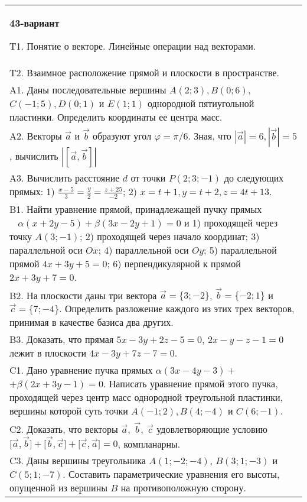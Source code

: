\documentclass{article}
\begin{document}
\begin{tabular}{m{17cm}}
\textbf{43-вариант}
\newline

T1. 
Понятие о векторе. Линейные операции над векторами.
 \\
T2. 
Взаимное расположение прямой и плоскости в пространстве.
 \\
A1. 
Даны последовательные вершины \(A(2;3),B(0;6)\), \(C( - 1;5),D(0;1)\) и \(E(1;1)\) однородной пятиугольной пластинки. Определить координаты ее центра масс.
 \\
A2. 
Векторы \(\overrightarrow{a}\) и \(\overrightarrow{b}\) образуют угол \(\varphi = \pi/6\). Зная, что \(|\overrightarrow{a}| = 6,|\overrightarrow{b}| = 5\), вычислить \(\left| \left\lbrack \overrightarrow{a},\overrightarrow{b} \right\rbrack \right|\)
 \\
A3. 
Вычислить расстояние \(d\) от точки \(P(2;3; - 1)\) до следующих прямых: 1) \(\frac{x - 5}{3} = \frac{y}{2} = \frac{z + 25}{- 2}\); 2) \(x = t + 1,y = t + 2,z = 4t + 13\).
 \\
B1. 
Найти уравнение прямой, принадлежащей пучку прямых \(\ \ \ \ \alpha(x + 2y - 5) + \beta(3x - 2y + 1) = 0\) и 1) проходящей через точку \(A(3; - 1)\); 2) проходящей через начало координат; 3) параллельной оси \(Ox\); 4) параллельной оси \(Oy\); 5) параллельной прямой \(4x + 3y + 5 = 0\); 6) перпендикулярной к прямой \(2x + 3y + 7 = 0\).
 \\
B2. На плоскости даны три вектора \(\overrightarrow{a} = \{ 3; - 2\}\), \(\overrightarrow{b} = \{ - 2;1\}\) и \(\overrightarrow{c} = \{ 7; - 4\}\). Определить разложение каждого из этих трех векторов, принимая в качестве базиса два других.
 \\
B3. 
Доказать, что прямая \(5x - 3y + 2z - 5 = 0\), \(2x - y - z - 1 = 0\) лежит в плоскости \(4x - 3y + 7z - 7 = 0\).
 \\
C1. 
Дано уравнение пучка прямых \(\alpha(3x - 4y - 3) +\) \(+ \beta(2x + 3y - 1) = 0\). Написать уравнение прямой этого пучка, проходящей через центр масс однородной треугольной пластинки, вершины которой суть точки \(A( - 1;2),B(4; - 4)\) и \(C(6; - 1)\).
 \\
C2. 
Доказать, что векторы \(\overrightarrow{a},\ \overrightarrow{b},\ \overrightarrow{c}\) удовлетворяющие условию \(\lbrack\overrightarrow{a},\overrightarrow{b}\rbrack + \lbrack\overrightarrow{b},\overrightarrow{c}\rbrack + \lbrack\overrightarrow{c},\overrightarrow{a}\rbrack = 0\), компланарны.
 \\
C3. 
Даны вершины треугольника \(A(1; - 2; - 4)\), \(B(3;1; - 3)\) и \(C(5;1; - 7)\). Составить параметрические уравнения его высоты, опущенной из вершины \(B\) на противоположную сторону.
 \\

\end{tabular}
\vspace{1cm}
\end{document}
